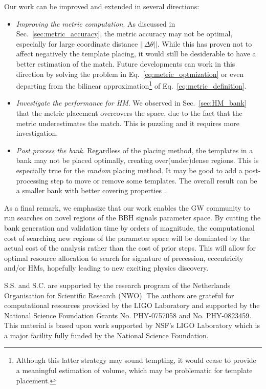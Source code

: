 \documentclass[twocolumn,showpacs,preprintnumbers,nofootinbib,prd,
superscriptaddress,10pt]{revtex4-2}
\begin{document}
Our work can be improved and extended in several directions:
\begin{itemize}
	\item {\it Improving the metric computation}. As discussed in Sec.~\ref{sec:metric_accuracy}, the metric accuracy may not be optimal, especially for large coordinate distance $||\Delta\theta||$. While this has proven not to affect negatively the template placing, it would still be desiderable to have a better estimation of the match. Future developments can work in this direction by solving the problem in Eq.~\eqref{eq:metric_optmization} or even departing from the bilinear approximation\footnote{
Although this latter strategy may sound tempting, it would cease to provide a meaningful estimation of volume, which may be problematic for template placement.} of Eq.~\eqref{eq:metric_definition}.
	
	\item {\it Investigate the performance for HM}. We observed in Sec.~\ref{sec:HM_bank} that the metric placement overcovers the space, due to the fact that the metric underestimates the match. This is puzzling and it requires more investigation.
	
	\item {\it Post process the bank}. Regardless of the placing method, the templates in a bank may not be placed optimally, creating over(under)dense regions. This is especially true for the {\it random} placing method. It may be good to add a post-processing step to move or remove some templates. The overall result can be a smaller bank with better covering properties \cite{Indik:2017vqq}.
\end{itemize}

As a final remark, we emphasize that our work enables the GW community to run searches on novel regions of the BBH signals parameter space. By cutting the bank generation and validation time by orders of magnitude, the computational cost of searching new regions of the parameter space will be dominated by the actual cost of the analysis rather than the cost of prior steps.
This will allow for optimal resource allocation to search for signature of precession, eccentricity and/or HMs, hopefully leading to new exciting physics discovery.

        \begin{acknowledgments}
		S.S. and S.C. are supported by the research program of the Netherlands Organisation for Scientific Research (NWO).
		The authors are grateful for computational resources provided by the LIGO Laboratory and supported by the National Science Foundation Grants No. PHY-0757058 and No. PHY-0823459. This material is based upon work supported by NSF’s LIGO Laboratory which is a major facility fully funded by the National Science Foundation.
        \end{acknowledgments}
\end{document}
